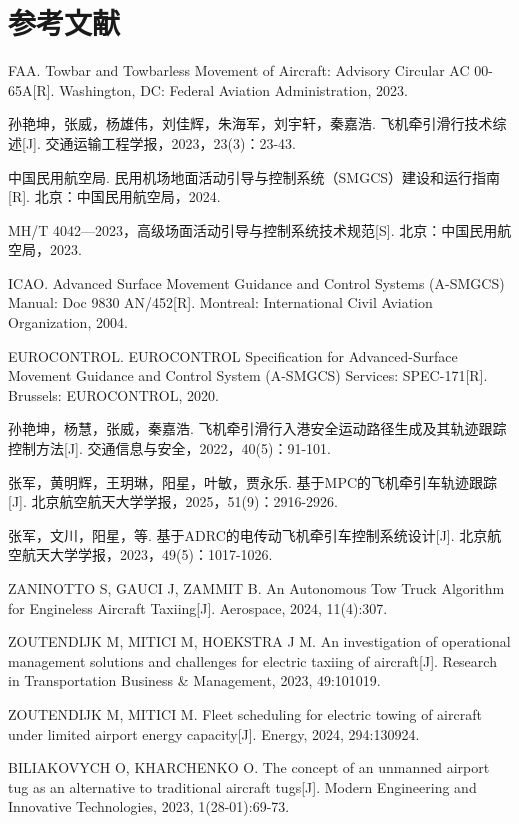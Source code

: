 \chapter*{参考文献}
\begin{enumerate}[label={[\arabic*]},leftmargin=2.2em,itemsep=0.2em]
  \item FAA. Towbar and Towbarless Movement of Aircraft: Advisory Circular AC 00-65A[R]. Washington, DC: Federal Aviation Administration, 2023.
  \item 孙艳坤，张威，杨雄伟，刘佳辉，朱海军，刘宇轩，秦嘉浩. 飞机牵引滑行技术综述[J]. 交通运输工程学报，2023，23(3)：23-43.
  \item 中国民用航空局. 民用机场地面活动引导与控制系统（SMGCS）建设和运行指南[R]. 北京：中国民用航空局，2024.
  \item MH/T 4042—2023，高级场面活动引导与控制系统技术规范[S]. 北京：中国民用航空局，2023.
  \item ICAO. Advanced Surface Movement Guidance and Control Systems (A-SMGCS) Manual: Doc 9830 AN/452[R]. Montreal: International Civil Aviation Organization, 2004.
  \item EUROCONTROL. EUROCONTROL Specification for Advanced-Surface Movement Guidance and Control System (A-SMGCS) Services: SPEC-171[R]. Brussels: EUROCONTROL, 2020.
  \item 孙艳坤，杨慧，张威，秦嘉浩. 飞机牵引滑行入港安全运动路径生成及其轨迹跟踪控制方法[J]. 交通信息与安全，2022，40(5)：91-101.
  \item 张军，黄明辉，王玥琳，阳星，叶敏，贾永乐. 基于MPC的飞机牵引车轨迹跟踪[J]. 北京航空航天大学学报，2025，51(9)：2916-2926.
  \item 张军，文川，阳星，等. 基于ADRC的电传动飞机牵引车控制系统设计[J]. 北京航空航天大学学报，2023，49(5)：1017-1026.
  \item ZANINOTTO S, GAUCI J, ZAMMIT B. An Autonomous Tow Truck Algorithm for Engineless Aircraft Taxiing[J]. Aerospace, 2024, 11(4):307.
  \item ZOUTENDIJK M, MITICI M, HOEKSTRA J M. An investigation of operational management solutions and challenges for electric taxiing of aircraft[J]. Research in Transportation Business \& Management, 2023, 49:101019.
  \item ZOUTENDIJK M, MITICI M. Fleet scheduling for electric towing of aircraft under limited airport energy capacity[J]. Energy, 2024, 294:130924.
  \item BILIAKOVYCH O, KHARCHENKO O. The concept of an unmanned airport tug as an alternative to traditional aircraft tugs[J]. Modern Engineering and Innovative Technologies, 2023, 1(28-01):69-73.

\end{enumerate}
